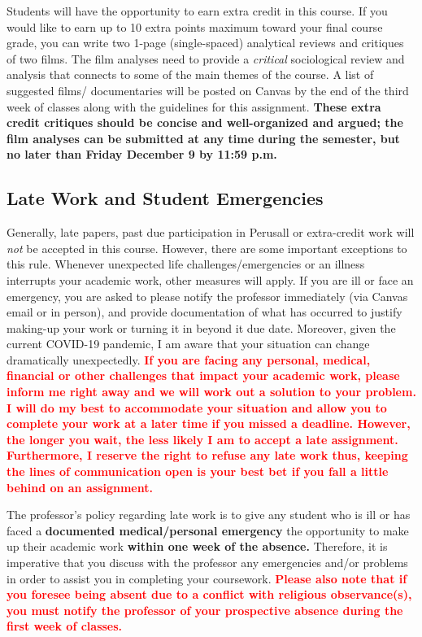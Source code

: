\documentclass[11pt,]{article}
\begin{document}
Students will have the opportunity to earn extra credit in this course.
If you would like to earn up to 10 extra points maximum toward your
final course grade, you can write two 1-page (single-spaced) analytical
reviews and critiques of two films. The film analyses need to provide a
\emph{critical} sociological review and analysis that connects to some
of the main themes of the course. A list of suggested films/
documentaries will be posted on Canvas by the end of the third week of
classes along with the guidelines for this assignment. \textbf{These
extra credit critiques should be concise and well-organized and argued;
the film analyses can be submitted at any time during the semester, but
no later than Friday December 9 by 11:59 p.m.}

\hypertarget{late-work-and-student-emergencies}{%
\subsection{Late Work and Student
Emergencies}\label{late-work-and-student-emergencies}}

Generally, late papers, past due participation in Perusall or
extra-credit work will \emph{not} be accepted in this course. However,
there are some important exceptions to this rule. Whenever unexpected
life challenges/emergencies or an illness interrupts your academic work,
other measures will apply. If you are ill or face an emergency, you are
asked to please notify the professor immediately (via Canvas email or in
person), and provide documentation of what has occurred to justify
making-up your work or turning it in beyond it due date. Moreover, given
the current COVID-19 pandemic, I am aware that your situation can change
dramatically unexpectedly.
\textbf{\textcolor{red}{If you are facing any personal, medical, financial or other challenges that impact your academic work, please inform me right away and we will work out a solution to your problem. I will do my best to accommodate your situation and allow you to complete your work at a later time if you missed a deadline.}
\textcolor{red}{However, the longer you wait, the less likely I am to accept a late assignment. Furthermore, I reserve the right to refuse any late work thus, keeping the lines of communication open is your best bet if you fall a little behind on an assignment.}}

The professor's policy regarding late work is to give any student who is
ill or has faced a \textbf{documented medical/personal emergency} the
opportunity to make up their academic work \textbf{within one week of
the absence.} Therefore, it is imperative that you discuss with the
professor any emergencies and/or problems in order to assist you in
completing your coursework.
\textcolor{red}{\bf{Please also note that if you foresee being absent due to a conflict with religious observance(s), you must notify the professor of your prospective absence during the first week of classes.}}
\end{document}
